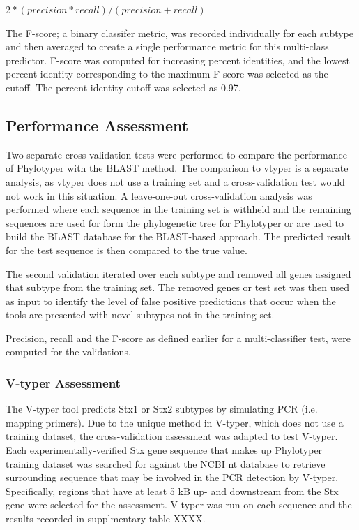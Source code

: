 \documentclass[11pt,letterpaper]{article}
\begin{document}
$2 * ( precision * recall ) / ( precision + recall )$

The F-score; a binary classifer metric, was recorded individually for each subtype and then averaged to create a single performance metric for this multi-class predictor.  F-score was computed for increasing percent identities, and the lowest percent identity corresponding to the maximum F-score was selected as the cutoff. The percent identity cutoff was selected as 0.97.

\subsection{Performance Assessment}

Two separate cross-validation tests were performed to compare the performance of Phylotyper with the BLAST method. The comparison to vtyper is a separate analysis, as vtyper does not use a training set and a cross-validation test would not work in this situation. A leave-one-out cross-validation analysis was performed where each sequence in the training set is withheld and the remaining sequences are used for form the phylogenetic tree for Phylotyper or are used to build the BLAST database for the BLAST-based approach. The predicted result for the test sequence is then compared to the true value.

The second validation iterated over each subtype and removed all genes assigned that subtype from the training set. The removed genes or test set was then used as input to identify the level of false positive predictions that occur when the tools are presented with novel subtypes not in the training set.

Precision, recall and the F-score as defined earlier for a multi-classifier test, were computed for the validations.

\subsubsection{V-typer Assessment}

The V-typer tool predicts Stx1 or Stx2 subtypes by simulating PCR (i.e. mapping primers). Due to the unique method in V-typer,  which does not use a training dataset, the cross-validation assessment was adapted to test V-typer. Each experimentally-verified Stx gene sequence that makes up Phylotyper training dataset was searched for against the NCBI nt database to retrieve surrounding sequence that may be involved in the PCR detection by V-typer.  Specifically, regions that have at least 5 kB up- and downstream from the Stx gene were selected for the assessment. V-typer was run on each sequence and the results recorded in supplmentary table XXXX.
\end{document}
